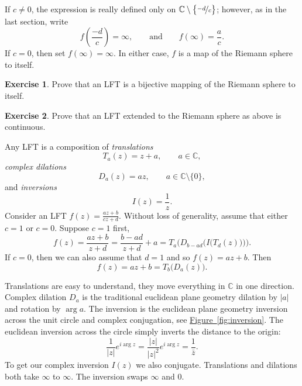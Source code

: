 \documentclass[12pt,openany]{book}
\newcommand{\sabs}[1]{\lvert {#1} \rvert}
\newcommand{\C}{{\mathbb{C}}}
\theoremstyle{plain}
\theoremstyle{remark}
\theoremstyle{definition}
\newenvironment{exbox}{%
    \def\FrameCommand{\vrule width 1pt \relax\hspace{10pt}}%
    \MakeFramed{\advance\hsize-\width\FrameRestore}%
}{%
    \endMakeFramed
}
\theoremstyle{exercise}
\newtheorem{exercise}{Exercise}[section]
\theoremstyle{example}
\newcommand{\figureref}[1]{\hyperref[#1]{Figure~\ref*{#1}}}
\begin{document}
If $c\not=0$,
the expression is really defined only on
$\C \setminus \bigl\{ \nicefrac{-d}{c} \bigr\}$;
however, as in the last section, write
\begin{equation*}
f\left(\frac{-d}{c}\right) = \infty, \qquad \text{and} \qquad
f(\infty) = \frac{a}{c} .
\end{equation*}
If $c=0$, then set $f(\infty) = \infty$.  In either case, $f$ is a map of
the Riemann sphere to itself.

\begin{exbox}
\begin{exercise}%
Prove that an LFT is a bijective mapping of the Riemann sphere to itself.
\end{exercise}

\begin{exercise}%
Prove that an LFT extended to the Riemann sphere as above is continuous.
\end{exercise}
\end{exbox}

Any LFT is a composition of \emph{translations}
\begin{equation*}
T_a(z) = z + a , \qquad a \in \C,
\end{equation*}
\emph{complex dilations}
\begin{equation*}
D_a(z) = az , \qquad a \in \C \setminus \{ 0 \} ,
\end{equation*}
and \emph{inversions}
\begin{equation*}
I(z) = \frac{1}{z}.
\end{equation*}
Consider an LFT $f(z) = \frac{az+b}{cz+d}$.
Without loss of generality, assume that either $c=1$ or $c=0$.
Suppose $c=1$ first,
\begin{equation*}
f(z)
=
\frac{a z + b}{z + d}
=
\frac{b-ad}{z+d}+a
=
T_a\biggr(D_{b-ad}\Bigr(I\bigl(T_d(z)\bigr)\Bigr)\biggr) .
\end{equation*}
If $c=0$, then we can also assume that $d=1$ and
so $f(z) = az + b$.
Then
\begin{equation*}
f(z) = az+b = T_b\bigl(D_a(z)\bigr) .
\end{equation*}

Translations are easy to understand, they move everything in $\C$ in one
direction.  Complex
dilation $D_a$ is the traditional euclidean plane geometry dilation by $\sabs{a}$
and rotation by $\arg a$.
The inversion is the euclidean plane geometry inversion
across the unit circle
and complex conjugation, see \figureref{fig:inversion}.  The euclidean
inversion across the circle simply inverts the distance to the origin:
\begin{equation*}
\frac{1}{\sabs{z}} e^{i \arg z} = 
\frac{\sabs{z}}{\sabs{z}^2} e^{i \arg z} = \frac{1}{\bar{z}} .
\end{equation*}
To get our complex inversion $I(z)$ we also conjugate.
Translations and dilations both take $\infty$ to $\infty$.
The inversion swaps $\infty$ and $0$.
\end{document}
